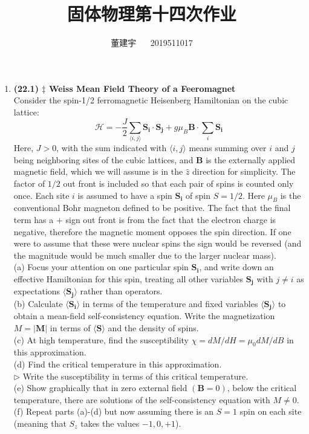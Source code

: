 \documentclass[reqno,a4paper,12pt]{amsart}
\title{固体物理第十四次作业}
\author{董建宇 ~~ 2019511017}
\begin{document}
\maketitle

\begin{enumerate}[1.]

\item \textbf{(22.1) $\ddagger$ Weiss Mean Field Theory of a Feeromagnet} \\
Consider the spin-1/2 ferromagnetic Heisenberg Hamiltonian on the cubic lattice: 
\[
	\mathscr{H} = -\frac{J}{2}\sum_{\langle i,j \rangle} \mathbf{S_i\cdot S_j} + g\mu_B\mathbf{B} \cdot \sum_{i} \mathbf{S_i}
\]
Here, $J>0$, with the sum indicated with $\langle i,j \rangle$ means summing over $i$ and $j$ being neighboring sites of the cubic lattices, and $\mathbf{B}$ is the externally applied magnetic field, which we will assume is in the $\hat{z}$ direction for simplicity. The factor of $1/2$ out front is included so that each pair of spins is counted only once. Each site $i$ is assumed to have a spin $\mathbf{S_i}$ of spin $S = 1/2$. Here $\mu_B$ is the conventional Bohr magneton defined to be positive. The fact that the final term has a $+$ sign out front is from the fact that the electron charge is negative, therefore the magnetic moment opposes the spin direction. If one were to assume that these were nuclear spins the sign would be reversed (and the magnitude would be much smaller due to the larger nuclear mass). \\
(a) Focus your attention on one particular spin $\mathbf{S_i}$, and write down an effective Hamiltonian for this spin, treating all other variables $\mathbf{S_j}$ with $j \neq i$ as expectations $\langle \mathbf{S_j} \rangle$ rather than operators. \\
(b) Calculate $\langle \mathbf{S_i} \rangle$ in terms of the temperature and fixed variables $\langle \mathbf{S_j} \rangle$ to obtain a mean-field self-consistency equation. Write the magnetization $M = \vert \mathbf{M} \vert$ in terms of $\langle \mathbf{S} \rangle$ and the density of spins. \\
(c) At high temperature, find the susceptibility $\chi = dM/dH = \mu_0dM/dB$ in this approximation. \\
(d) Find the critical temperature in this approximation. \\ 
$\triangleright$ Write the susceptibility in terms of this critical temperature. \\
(e) Show graphically that in zero external field $(\mathbf{B} = 0)$, below the critical temperature, there are solutions of the self-consistency equation with $M \neq 0$. \\
(f) Repeat parts (a)-(d) but now assuming there is an $S=1$ spin on each site (meaning that $S_z$ takes the values $-1,0,+1$).
\begin{tcolorbox}[breakable, colframe = black, colback = black!5!white]
\begin{enumerate}[(a)]


\end{enumerate}
\end{tcolorbox}
\end{enumerate}
\end{document}
